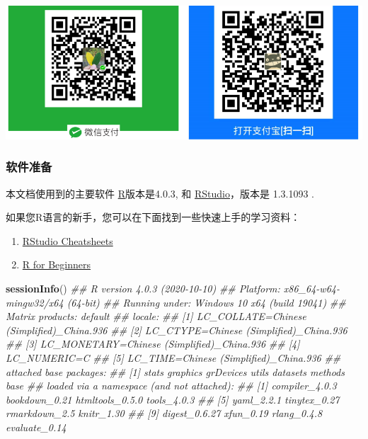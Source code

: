 \documentclass[
]{article}
\newenvironment{Shaded}{\begin{snugshade}}{\end{snugshade}}
\newcommand{\CommentTok}[1]{\textcolor[rgb]{0.56,0.35,0.01}{\textit{#1}}}
\newcommand{\KeywordTok}[1]{\textcolor[rgb]{0.13,0.29,0.53}{\textbf{#1}}}
\newcommand{\NormalTok}[1]{#1}
\providecommand{\tightlist}{%
  \setlength{\itemsep}{0pt}\setlength{\parskip}{0pt}}
\begin{document}
\begin{center}\includegraphics[width=0.7\linewidth]{image/SponsorshipFig} \end{center}

\hypertarget{ux8f6fux4ef6ux51c6ux5907}{%
\subsubsection{软件准备}\label{ux8f6fux4ef6ux51c6ux5907}}

本文档使用到的主要软件 \href{https://www.r-project.org/}{R}版本是4.0.3, 和 \href{https://rstudio.com/}{RStudio}，版本是 1.3.1093 .

如果您R语言的新手，您可以在下面找到一些快速上手的学习资料：

\begin{enumerate}
\def\labelenumi{\arabic{enumi}.}
\tightlist
\item
  \href{https://rstudio.com/resources/cheatsheets/}{RStudio Cheatsheets}
\item
  \href{https://cran.r-project.org/doc/contrib/Paradis-rdebuts_en.pdf}{R for Beginners}
\end{enumerate}

\begin{Shaded}
\begin{Highlighting}[]
\KeywordTok{sessionInfo}\NormalTok{()}
\CommentTok{## R version 4.0.3 (2020-10-10)}
\CommentTok{## Platform: x86_64-w64-mingw32/x64 (64-bit)}
\CommentTok{## Running under: Windows 10 x64 (build 19041)}
\CommentTok{## Matrix products: default}
\CommentTok{## locale:}
\CommentTok{## [1] LC_COLLATE=Chinese (Simplified)_China.936 }
\CommentTok{## [2] LC_CTYPE=Chinese (Simplified)_China.936   }
\CommentTok{## [3] LC_MONETARY=Chinese (Simplified)_China.936}
\CommentTok{## [4] LC_NUMERIC=C                              }
\CommentTok{## [5] LC_TIME=Chinese (Simplified)_China.936    }
\CommentTok{## attached base packages:}
\CommentTok{## [1] stats     graphics  grDevices utils     datasets  methods   base     }
\CommentTok{## loaded via a namespace (and not attached):}
\CommentTok{##  [1] compiler_4.0.3  bookdown_0.21   htmltools_0.5.0 tools_4.0.3    }
\CommentTok{##  [5] yaml_2.2.1      tinytex_0.27    rmarkdown_2.5   knitr_1.30     }
\CommentTok{##  [9] digest_0.6.27   xfun_0.19       rlang_0.4.8     evaluate_0.14  }
\end{Highlighting}
\end{Shaded}
\end{document}

